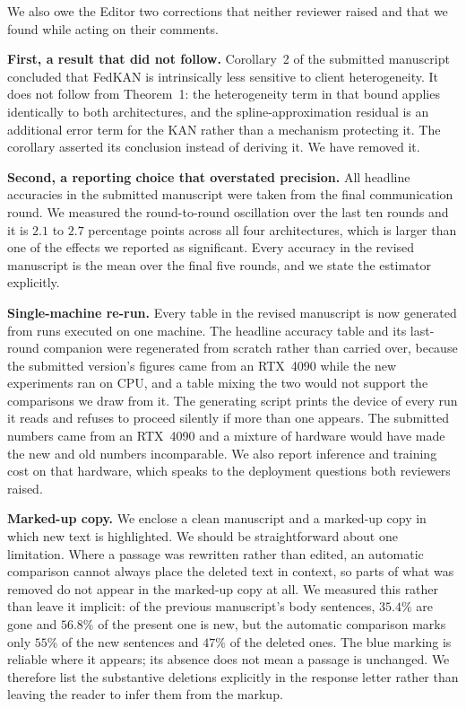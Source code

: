 \documentclass[11pt]{article}
\begin{document}
We also owe the Editor two corrections that neither reviewer raised and that we found while
acting on their comments.

\textbf{First, a result that did not follow.} Corollary~2 of the submitted manuscript
concluded that FedKAN is intrinsically less sensitive to client heterogeneity. It does not
follow from Theorem~1: the heterogeneity term in that bound applies identically to both
architectures, and the spline-approximation residual is an additional error term for the
KAN rather than a mechanism protecting it. The corollary asserted its conclusion instead of
deriving it. We have removed it.

\textbf{Second, a reporting choice that overstated precision.} All headline accuracies in
the submitted manuscript were taken from the final communication round. We measured the
round-to-round oscillation over the last ten rounds and it is $2.1$ to $2.7$ percentage
points across all four architectures, which is larger than one of the effects we reported
as significant. Every accuracy in the revised manuscript is the mean over the final five
rounds, and we state the estimator explicitly.

\textbf{Single-machine re-run.} Every table in the revised manuscript is now generated from
runs executed on one machine. The headline accuracy table and its last-round companion were
regenerated from scratch rather than carried over, because the submitted version's figures came
from an RTX~4090 while the new experiments ran on CPU, and a table mixing the two would not
support the comparisons we draw from it. The generating script prints the device of every run it
reads and refuses to proceed silently if more than one appears. The submitted numbers came
from an RTX~4090 and a mixture of hardware would have made the new and old numbers
incomparable. We also report inference and training cost on that hardware, which speaks to
the deployment questions both reviewers raised.

\textbf{Marked-up copy.} We enclose a clean manuscript and a marked-up copy in which new
text is highlighted. We should be straightforward about one limitation. Where a passage was
rewritten rather than edited, an automatic comparison cannot always place the deleted text
in context, so parts of what was removed do not appear in the marked-up copy at all. We
measured this rather than leave it implicit: of the previous manuscript's body sentences,
$35.4\%$ are gone and $56.8\%$ of the present one is new, but the automatic comparison marks
only $55\%$ of the new sentences and $47\%$ of the deleted ones. The blue marking is reliable
where it appears; its absence does not mean a passage is unchanged. We therefore list the
substantive deletions explicitly in the response letter rather than leaving the reader to
infer them from the markup.
\end{document}
